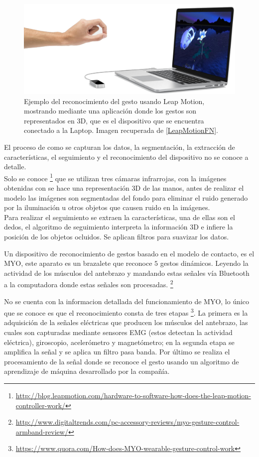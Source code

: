 \begin{figure}[h!]
\begin{center}
\includegraphics[scale=.3]{./Figures/LeapMotion.png}
\end{center}
\caption{Ejemplo del reconocimiento del gesto usando Leap Motion, mostrando mediante una aplicación donde los gestos son representados en 3D, que es el dispositivo que se encuentra conectado a la Laptop. Imagen recuperada de \ref{LeapMotionFN}.}
\label{fig:LeapMotion}
\end{figure}

El proceso de como se capturan los datos, la segmentación, la extracción de características, el seguimiento y el reconocimiento del dispositivo no se conoce a detalle.\\ 
Solo se conoce \footnote{ \url{http://blog.leapmotion.com/hardware-to-software-how-does-the-leap-motion-controller-work/}} que se utilizan tres cámaras infrarrojas, con la imágenes obtenidas con se hace una representación 3D de las manos, antes de realizar el modelo las imágenes son segmentadas del fondo para eliminar el ruido generado por la iluminación u otros objetos que causen ruido en la imágenes. \\
Para realizar el seguimiento se extraen la características, una de ellas son el dedos, el algoritmo de seguimiento interpreta la información 3D e infiere la posición de los objetos ocluidos. Se aplican filtros para suavizar los datos. 


Un dispositivo de reconocimiento de gestos basado en el modelo de contacto, es el MYO, este aparato es un brazalete que reconoce $5$ gestos dinámicos. Leyendo la actividad de los músculos del antebrazo y mandando estas señales vía Bluetooth a la computadora donde estas señales son procesadas. \footnote{\url{http://www.digitaltrends.com/pc-accessory-reviews/myo-gesture-control-armband-review/}} 

No se cuenta con la informacion detallada del funcionamiento de MYO, lo único que se conoce es que el reconocimiento consta de tres etapas \footnote{\url{https://www.quora.com/How-does-MYO-wearable-gesture-control-work}}. La primera es la adquisición de la señales eléctricas que producen los músculos del antebrazo, las cuales son capturadas mediante sensores EMG (estos detectan la actividad eléctrica), giroscopio, acelerómetro y magnetómetro; en la segunda etapa se amplifica la señal y se aplica un filtro pasa banda. Por último se realiza el procesamiento de la señal donde se reconoce el gesto usando un algoritmo de aprendizaje de máquina desarrollado por la compañía.  


